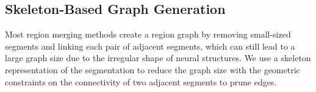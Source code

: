 \subsection{Skeleton-Based Graph Generation}
\label{sec:skeletonization}
Most region merging methods create a region graph by removing small-sized segments and linking each pair of adjacent segments, which can still lead to a large graph size due to the irregular shape of neural structures.
We use a skeleton representation of the segmentation to reduce the graph size with the geometric constraints on the connectivity of two adjacent segments to prune edges.


